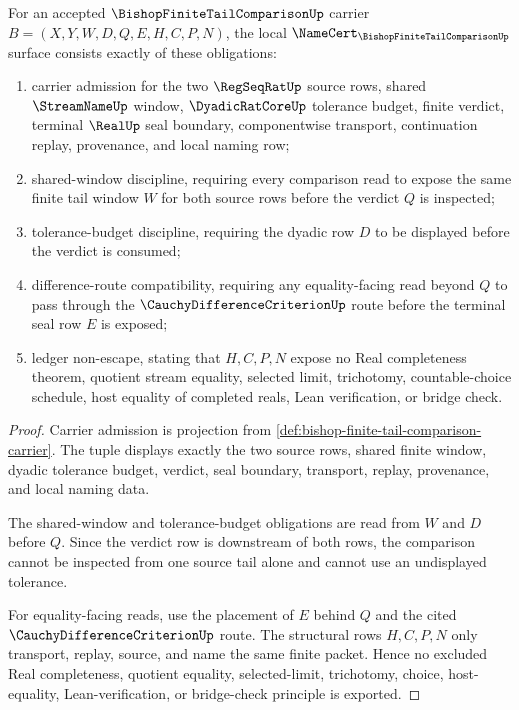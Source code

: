 \begin{theorem}
\label{thm:bishop-finite-tail-comparison-namecert-obligations}
For an accepted $\BishopFiniteTailComparisonUp$ carrier $B=(X,Y,W,D,Q,E,H,C,P,N)$, the local $\NameCert_{\BishopFiniteTailComparisonUp}$ surface consists exactly of these obligations:
\begin{enumerate}
\item carrier admission for the two $\RegSeqRatUp$ source rows, shared $\StreamNameUp$ window, $\DyadicRatCoreUp$ tolerance budget, finite verdict, terminal $\RealUp$ seal boundary, componentwise transport, continuation replay, provenance, and local naming row;
\item shared-window discipline, requiring every comparison read to expose the same finite tail window $W$ for both source rows before the verdict $Q$ is inspected;
\item tolerance-budget discipline, requiring the dyadic row $D$ to be displayed before the verdict is consumed;
\item difference-route compatibility, requiring any equality-facing read beyond $Q$ to pass through the $\CauchyDifferenceCriterionUp$ route before the terminal seal row $E$ is exposed;
\item ledger non-escape, stating that $H,C,P,N$ expose no Real completeness theorem, quotient stream equality, selected limit, trichotomy, countable-choice schedule, host equality of completed reals, Lean verification, or bridge check.
\end{enumerate}
\end{theorem}
\begin{proof}
Carrier admission is projection from \autoref{def:bishop-finite-tail-comparison-carrier}. The tuple displays exactly the two source rows, shared finite window, dyadic tolerance budget, verdict, seal boundary, transport, replay, provenance, and local naming data.

The shared-window and tolerance-budget obligations are read from $W$ and $D$ before $Q$. Since the verdict row is downstream of both rows, the comparison cannot be inspected from one source tail alone and cannot use an undisplayed tolerance.

For equality-facing reads, use the placement of $E$ behind $Q$ and the cited $\CauchyDifferenceCriterionUp$ route. The structural rows $H,C,P,N$ only transport, replay, source, and name the same finite packet. Hence no excluded Real completeness, quotient equality, selected-limit, trichotomy, choice, host-equality, Lean-verification, or bridge-check principle is exported.
\end{proof}

